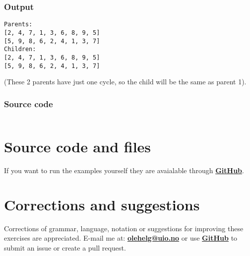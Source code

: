 \documentclass{article}           %
\begin{document}
\subsubsection{Output}
\begin{verbatim}
Parents:
[2, 4, 7, 1, 3, 6, 8, 9, 5]
[5, 9, 8, 6, 2, 4, 1, 3, 7]
Children:
[2, 4, 7, 1, 3, 6, 8, 9, 5]
[5, 9, 8, 6, 2, 4, 1, 3, 7]
\end{verbatim}
(These 2 parents have just one cycle, so the child will be the same as parent 1).
\subsubsection{Source code}
\inputminted{Python}{cycle.py}

\section*{Source code and files}
If you want to run the examples yourself they are avaialable through \href{https://github.com/olehermanse/INF3490-AI_Machine_Learning}{\textbf{GitHub}}.

\section*{Corrections and suggestions}
Corrections of grammar, language, notation or suggestions for improving these exercises are appreciated.
E-mail me at: \href{mailto:olehelg@uio.no}{\textbf{olehelg@uio.no}} or use
\href{https://github.com/olehermanse/INF3490-AI_Machine_Learning}{\textbf{GitHub}}
to submit an issue or create a pull request.
\end{document}
